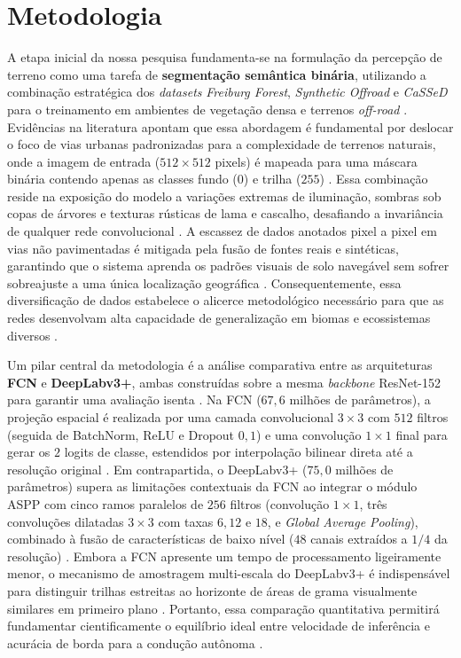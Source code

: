 \documentclass[a4paper,10pt, twocolumn]{article}
\begin{document}
\section{Metodologia}

A etapa inicial da nossa pesquisa fundamenta-se na formulação da percepção de terreno como uma tarefa de \textbf{segmentação semântica binária}, 
utilizando a combinação estratégica dos \textit{datasets} \textit{Freiburg Forest}, \textit{Synthetic Offroad} e \textit{CaSSeD} para o treinamento em ambientes de vegetação 
densa e terrenos \textit{off-road} \cite{s19112577, s26061944, KABIR2025102644}. Evidências na literatura apontam que essa abordagem é fundamental por 
deslocar o foco de vias urbanas padronizadas para a complexidade de terrenos naturais, onde a imagem de entrada ($512 \times 512$ pixels) é mapeada para 
uma máscara binária contendo apenas as classes fundo ($0$) e trilha ($255$) \cite{LATEEF2019321, s19112577}. Essa combinação 
reside na exposição do modelo a variações extremas de iluminação, sombras sob copas de árvores e texturas rústicas de lama e cascalho, desafiando a invariância de qualquer 
rede convolucional \cite{LATEEF2019321, BEYCIMEN2016113680}. A escassez de dados anotados pixel a pixel em vias não pavimentadas é mitigada pela fusão de fontes reais e sintéticas, 
garantindo que o sistema aprenda os padrões visuais de solo navegável sem sofrer sobreajuste a uma única localização geográfica \cite{s19112577, s26061944}. 
Consequentemente, essa diversificação de dados estabelece o alicerce metodológico necessário para que as redes desenvolvam alta capacidade de generalização em biomas e 
ecossistemas diversos \cite{s26061944, KABIR2025102644}. 

Um pilar central da metodologia é a análise comparativa entre as arquiteturas \textbf{FCN} e \textbf{DeepLabv3+}, ambas construídas sobre a mesma \textit{backbone} 
ResNet-152 para garantir uma avaliação isenta \cite{Long2015, LATEEF2019321, Sgibnev2020}. 
Na FCN ($67,6$ milhões de parâmetros), a projeção espacial é realizada por uma camada convolucional $3 \times 3$ com $512$ filtros 
(seguida de BatchNorm, ReLU e Dropout $0,1$) e uma convolução $1 \times 1$ final para gerar os $2$ logits de classe, estendidos por interpolação bilinear 
direta até a resolução original \cite{Long2015}. Em contrapartida, o DeepLabv3+ ($75,0$ milhões de parâmetros) supera as limitações contextuais da FCN ao integrar o módulo 
ASPP com cinco ramos paralelos de $256$ filtros (convolução $1 \times 1$, três convoluções dilatadas $3 \times 3$ com taxas $6, 12$ e $18$, e 
\textit{Global Average Pooling}), combinado à fusão de características de baixo nível ($48$ canais extraídos a $1/4$ da resolução) \cite{LATEEF2019321, Sgibnev2020}. 
Embora a FCN apresente um tempo de processamento ligeiramente menor, o mecanismo de amostragem multi-escala do DeepLabv3+ é indispensável para distinguir trilhas 
estreitas ao horizonte de áreas de grama visualmente similares em primeiro plano \cite{LATEEF2019321, BEYCIMEN2016113680}. 
Portanto, essa comparação quantitativa permitirá fundamentar cientificamente o equilíbrio ideal entre velocidade de inferência e acurácia de borda para a 
condução autônoma \cite{GARCIAGARCIA201841, BEYCIMEN2016113680}. 
\end{document}
